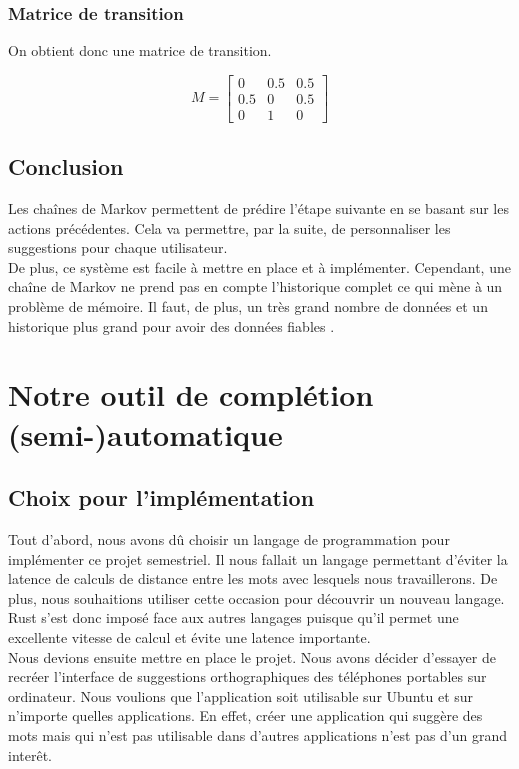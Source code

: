 \documentclass[a4paper, 11pt]{report}
\begin{document}
\subsection*{Matrice de transition}
On obtient donc une matrice de transition. 

\[
M =
\begin{bmatrix}
0 & 0.5 & 0.5 \\
0.5 & 0 & 0.5 \\
0 & 1 & 0
\end{bmatrix}
\]



\section{Conclusion}
Les chaînes de Markov permettent de prédire l'étape suivante en se basant sur les actions précédentes. Cela va permettre, par la suite, de personnaliser les suggestions pour chaque utilisateur. \\
De plus, ce système est facile à mettre en place et à implémenter. Cependant, une chaîne de Markov ne prend pas en compte l'historique complet ce qui mène à un problème de mémoire. Il faut, de plus, un très grand nombre de données et un historique plus grand pour avoir des données fiables .
\chapter{Notre outil de complétion (semi-)automatique}

\section{Choix pour l'implémentation}

Tout d'abord, nous avons dû choisir un langage de programmation pour implémenter ce projet semestriel. Il nous fallait un langage permettant d'éviter la latence de calculs de distance entre les mots avec lesquels nous travaillerons. De plus, nous souhaitions utiliser cette occasion pour découvrir un nouveau langage. Rust s'est donc imposé face aux autres langages puisque qu'il permet une excellente vitesse de calcul et évite une latence importante. \\

Nous devions ensuite mettre en place le projet. Nous avons décider d'essayer de recréer l'interface de suggestions orthographiques des téléphones portables sur ordinateur. Nous voulions que l'application soit utilisable sur Ubuntu et sur n'importe quelles applications. En effet, créer une application qui suggère des mots mais qui n'est pas utilisable dans d'autres applications n'est pas d'un grand interêt.\\
\end{document}
